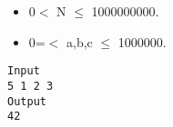 \begin{itemize}
	\item     0$<$ N  $\le$ 1000000000.   
	\item     0=$<$ a,b,c  $\le$ 1000000.   
\end{itemize}
\begin{verbatim}
Input
5 1 2 3
Output
42
\end{verbatim}
